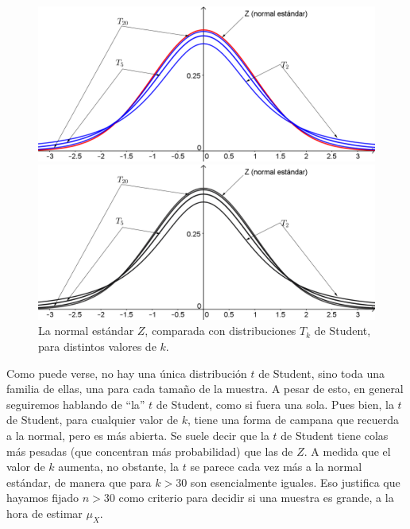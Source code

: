 \begin{figure}[h!]
\begin{center}
\begin{enColor}
\includegraphics[width=13cm]{../fig/Cap06-ZvsT-figura.png}
\end{enColor}
\begin{bn}
\includegraphics[width=13cm]{../fig/Cap06-ZvsT-figura-bn.png}
\end{bn}
\caption{La normal estándar $Z$, comparada con distribuciones $T_k$ de Student, para distintos valores de $k$.}
\label{cap06:fig:ZvsT}
\end{center}
\end{figure}

Como puede verse, no hay una única distribución $t$ de Student, sino toda una
familia de ellas, una para cada tamaño de la muestra. A pesar de esto, en
general seguiremos hablando de ``la'' $t$ de Student, como si fuera una sola.
Pues bien, la $t$ de Student, para cualquier valor de $k$, tiene una forma de
campana que recuerda a la normal, pero es más abierta. Se suele decir que la
$t$ de Student tiene colas más pesadas (que concentran más probabilidad) que
las de $Z$. A medida que el valor de $k$ aumenta, no obstante, la $t$ se parece
cada vez más a la normal estándar, de manera que para $k>30$ son esencialmente
iguales. Eso justifica que hayamos fijado $n>30$ como criterio para decidir si
una muestra es grande, a la hora de estimar $\mu_X$.

